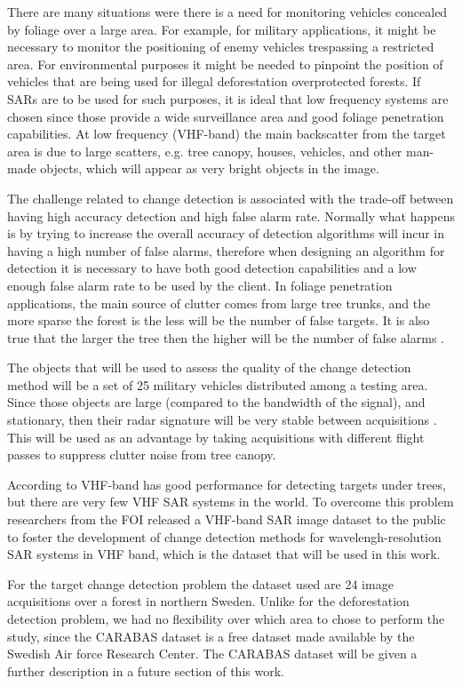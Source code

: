 There are many situations were there is a need for monitoring vehicles concealed by foliage over a large area.
For example, for military applications, it might be necessary to monitor the positioning of enemy vehicles trespassing
a restricted area. For environmental purposes it might be needed to pinpoint the position of vehicles that are being used
for illegal deforestation overprotected forests. If SARs are to be used for such purposes, it is ideal that low frequency systems
are chosen since those provide a wide surveillance area and good foliage penetration capabilities. 
At low frequency (VHF-band) the main backscatter from the target area is due to large scatters, e.g. tree canopy, houses,
vehicles, and other man-made objects, which will appear as very bright objects in the image.

The challenge related to change detection is associated with the trade-off between having high accuracy detection and high false alarm rate.
Normally what happens is by trying to increase the overall accuracy of detection algorithms will incur in having a high number of false alarms, 
therefore when designing an algorithm for detection it is necessary to have both good detection capabilities and a low enough false alarm rate
to be used by the client. In foliage penetration applications, the main source of clutter comes from large tree trunks, and the more sparse the
forest is the less will be the number of false targets. It is also true that the larger the tree then the higher will be the number of false alarms \cite{Book_ML}.

The objects that will be used to assess the quality of the change detection method will be a set of 25 military vehicles distributed among a testing area.
Since those objects are large (compared to the bandwidth of the signal), and stationary, then their radar signature will be very stable between acquisitions \cite{63}.
This will be used as an advantage by taking acquisitions with different flight passes to suppress clutter noise from tree canopy.

According to \cite{Carabas} VHF-band has good performance for detecting targets under trees, but there are very few VHF SAR systems in the world.
To overcome this problem researchers from the FOI released a VHF-band SAR image dataset to the public to foster the development of 
change detection methods for wavelengh-resolution SAR systems in VHF band, which is the dataset that will be used in this work.

For the target change detection problem the dataset used are 24 image acquisitions over a forest in northern Sweden. Unlike for the deforestation detection problem, we had no flexibility over which area to chose to perform the study, since the CARABAS dataset is a free dataset made available by the Swedish Air force Research Center. The CARABAS dataset will be given a further description in a future section of this work. 


